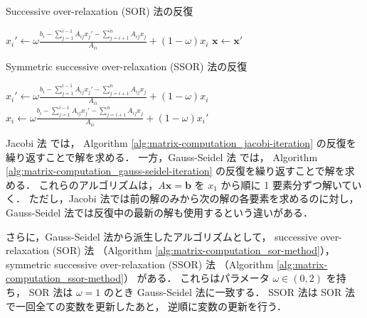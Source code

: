 \begin{algorithm}[p]
    \caption{Successive over-relaxation (SOR) 法の反復 \cite{Golub2013}}
    \label{alg:matrix-computation_sor-method}
    \begin{algorithmic}
        \State $x_i' \gets \omega \frac{\displaystyle b_i - \sum_{j = 1}^{i - 1} A_{ij} x_j' %
                - \sum_{j = i + 1}^{n} A_{ij} x_j}{\displaystyle A_{ii}} %
            + (1 - \omega) x_i$
        \EndFor
        \State $\bm{x} \gets \bm{x}'$
        \EndProcedure
    \end{algorithmic}
\end{algorithm}

\begin{algorithm}[p]
    \caption{Symmetric successive over-relaxation (SSOR) 法の反復 \cite{Golub2013}}
    \label{alg:matrix-computation_ssor-method}
    \begin{algorithmic}
        \State $x_i' \gets \omega \frac{\displaystyle b_i - \sum_{j = 1}^{i - 1} A_{ij} x_j' %
                - \sum_{j = i + 1}^{n} A_{ij} x_j}{\displaystyle A_{ii}} %
            + (1 - \omega) x_i$
        \EndFor
        \State $x_i \gets \omega \frac{\displaystyle b_i - \sum_{j = 1}^{i - 1} A_{ij} x_j' %
                - \sum_{j = i + 1}^{n} A_{ij} x_j}{\displaystyle A_{ii}} %
            + (1 - \omega) x_i'$
        \EndFor
        \EndProcedure
    \end{algorithmic}
\end{algorithm}

Jacobi 法
では，
Algorithm \ref{alg:matrix-computation_jacobi-iteration}
の反復を繰り返すことで解を求める．
一方，Gauss-Seidel 法
では，
Algorithm \ref{alg:matrix-computation_gauss-seidel-iteration}
の反復を繰り返すことで解を求める．
これらのアルゴリズムは，$A \bm{x} = \bm{b}$ を
$x_1$ から順に 1 要素分ずつ解いていく．
ただし，Jacobi 法では前の解のみから次の解の各要素を求めるのに対し，
Gauss-Seidel 法では反復中の最新の解も使用するという違いがある．

さらに，Gauss-Seidel 法から派生したアルゴリズムとして，
successive over-relaxation (SOR) 法
（Algorithm \ref{alg:matrix-computation_sor-method}），
symmetric successive over-relaxation (SSOR) 法
（Algorithm \ref{alg:matrix-computation_ssor-method}）
がある．
これらはパラメータ $\omega \in (0, 2)$ を持ち，
SOR 法は $\omega = 1$ のとき Gauss-Seidel 法に一致する．
SSOR 法は SOR 法で一回全ての変数を更新したあと，
逆順に変数の更新を行う．

